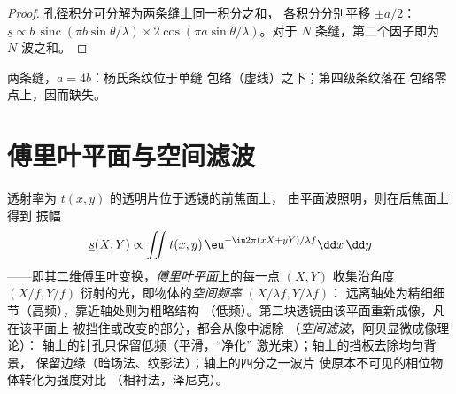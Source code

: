 \begin{proof}
孔径积分可分解为两条缝上同一积分之和，
各积分分别平移 $\pm a/2$：$\underline s \propto b\,\operatorname{sinc}(\pi b\sin\theta/\lambda)
\times2\cos(\pi a\sin\theta/\lambda)$。对于 $N$ 条缝，第二个因子即为
$N$ 波之和。
\end{proof}

\begin{omfigure}

{\small 两条缝，$a = 4b$：杨氏条纹位于单缝
包络（虚线）之下；第四级条纹落在
包络零点上，因而缺失。}
\end{omfigure}

\section{傅里叶平面与空间滤波}

\begin{proposition}[作为傅里叶分析器的透镜]\label{prop:b2:diffraction:fourier}
透射率为 $t(x, y)$ 的透明片位于透镜的前焦面上，
由平面波照明，则在后焦面上得到
振幅
\[
\underline s(X, Y) \propto \iint t(x, y)\,\eu^{-\iu2\pi(xX + yY)/\lambda f}\dd x\,\dd y
\]
——即其二维傅里叶变换，\emph{傅里叶平面}上的每一点 $(X, Y)$
收集沿角度
$(X/f, Y/f)$ 衍射的光，即物体的\emph{空间频率} $(X/\lambda f, Y/\lambda f)$：
远离轴处为精细细节（高频），靠近轴处则为粗略结构
（低频）。第二块透镜由该平面重新成像，凡在该平面上
被挡住或改变的部分，都会从像中滤除
（\emph{空间滤波}，阿贝显微成像理论）：
轴上的针孔只保留低频（平滑，“净化”
激光束）；轴上的挡板去除均匀背景，
保留边缘（暗场法、纹影法）；轴上的四分之一波片
使原本不可见的相位物体转化为强度对比
（相衬法，泽尼克）。
\end{proposition}

